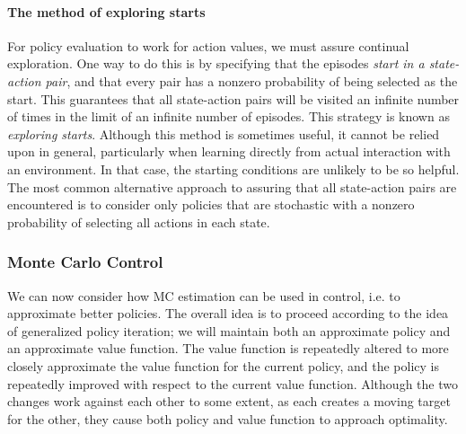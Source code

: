 \documentclass[12pt]{article}
\begin{document}
\paragraph{The method of exploring starts}
For policy evaluation to work for action values, we must assure continual exploration. One way to do this is by specifying that the episodes \emph{start in a state-action pair}, and that every pair has a nonzero probability of being selected as the start. This guarantees that all state-action pairs will be visited an infinite number of times in the limit of an infinite number of episodes. This strategy is known as \emph{exploring starts}. Although this method is sometimes useful, it cannot be relied upon in general, particularly when learning directly from actual interaction with an environment. In that case, the starting conditions are unlikely to be so helpful. The most common alternative approach to assuring that all state-action pairs are encountered is to consider only policies that are stochastic with a nonzero probability of selecting all actions in each state.
\subsubsection{Monte Carlo Control}
We can now consider how MC estimation can be used in control, i.e. to approximate better policies. The overall idea is to proceed according to the idea of generalized policy iteration; we will maintain both an approximate policy and an approximate value function. The value function is repeatedly altered to more closely approximate the value function for the current policy, and the policy is repeatedly improved with respect to the current value function. Although the two changes work against each other to some extent, as each creates a moving target for the other, they cause both policy and value function to approach optimality.
\end{document}
